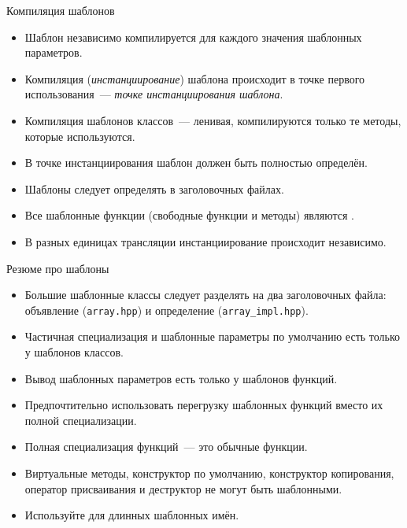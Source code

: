 \documentclass{beamer}
\begin{document}
\begin{frame}[fragile]{Компиляция шаблонов}
\small
    \begin{itemize}
        \item Шаблон независимо компилируется для каждого значения шаблонных
            параметров.

        \item Компиляция ({\em инстанциирование}) шаблона происходит в точке первого использования~---
            {\em точке инстанциирования шаблона}.

        \item Компиляция шаблонов классов~— ленивая, компилируются только те методы,
            которые используются.
        
        \item В точке инстанциирования шаблон должен быть полностью определён.

        \item Шаблоны следует определять в заголовочных файлах.

        \item Все шаблонные функции (свободные функции и методы) являются
            .

        \item В разных единицах трансляции инстанциирование происходит
            независимо.
    \end{itemize}
\end{frame}

\begin{frame}[fragile]{Резюме про шаблоны}
\small
    \begin{itemize}
        \item
            Большие шаблонные классы следует разделять на два заголовочных файла:
            объявление (\texttt{array.hpp}) и определение (\texttt{array\_impl.hpp}).

        \item Частичная специализация и шаблонные параметры по умолчанию
            есть только у шаблонов классов.

        \item Вывод шаблонных параметров есть только у шаблонов функций.

        \item Предпочтительно использовать перегрузку шаблонных функций вместо
            их полной специализации.

        \item Полная специализация функций~--- это обычные функции.
    
        \item Виртуальные методы, конструктор по умолчанию, конструктор
            копирования, оператор присваивания и деструктор не могут быть
            шаблонными.
        \item Используйте  для длинных шаблонных имён.
    \end{itemize}
\end{frame}
\end{document}

